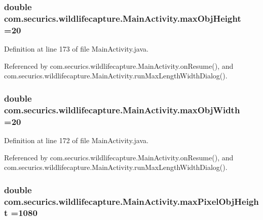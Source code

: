 \subsubsection[{max\+Obj\+Height}]{\setlength{\rightskip}{0pt plus 5cm}double com.\+securics.\+wildlifecapture.\+Main\+Activity.\+max\+Obj\+Height =20\hspace{0.3cm}{\ttfamily [static]}}\label{classcom_1_1securics_1_1wildlifecapture_1_1_main_activity_ac16616961300bb01e0691e9e526a9c59}


Definition at line 173 of file Main\+Activity.\+java.



Referenced by com.\+securics.\+wildlifecapture.\+Main\+Activity.\+on\+Resume(), and com.\+securics.\+wildlifecapture.\+Main\+Activity.\+run\+Max\+Length\+Width\+Dialog().

\subsubsection[{max\+Obj\+Width}]{\setlength{\rightskip}{0pt plus 5cm}double com.\+securics.\+wildlifecapture.\+Main\+Activity.\+max\+Obj\+Width =20\hspace{0.3cm}{\ttfamily [static]}}\label{classcom_1_1securics_1_1wildlifecapture_1_1_main_activity_a7e8c239d95e1869a8f7c3cc6327dbf13}


Definition at line 172 of file Main\+Activity.\+java.



Referenced by com.\+securics.\+wildlifecapture.\+Main\+Activity.\+on\+Resume(), and com.\+securics.\+wildlifecapture.\+Main\+Activity.\+run\+Max\+Length\+Width\+Dialog().

\subsubsection[{max\+Pixel\+Obj\+Height}]{\setlength{\rightskip}{0pt plus 5cm}double com.\+securics.\+wildlifecapture.\+Main\+Activity.\+max\+Pixel\+Obj\+Height =1080\hspace{0.3cm}{\ttfamily [static]}}\label{classcom_1_1securics_1_1wildlifecapture_1_1_main_activity_a56c6c4101234fe7219e315ea816fbf17}


